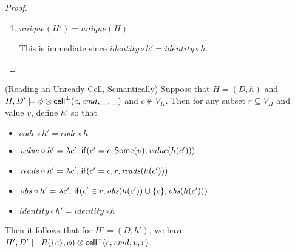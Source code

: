 \begin{proof}
\begin{enumerate}
\item $\mathit{unique}(H') = \mathit{unique}(H)$

This is immediate since $\mathit{identity} \circ h' = \mathit{identity} \circ h$.
\end{enumerate}
\end{proof}

\begin{lemma}{(Reading an Unready Cell, Semantically)}
Suppose that $H = (D,h)$ and $H, D' \models \phi \otimes
\mathsf{cell}^{\pm}({c}, {\mathit{cmd}}, {\_}, {\_})$ and $c \not\in V_H$. Then for any subset $r
\subseteq V_H$ and value $v$, define $h'$ so that
\begin{itemize}
\item $\mathit{code} \circ h' = \mathit{code} \circ h$ 
\item $\mathit{value} \circ h' = \lambda c'.\;\mathsf{if}({c' = c}, {\mathsf{Some}(v)}, {\mathit{value}(h(c'))})$ 
\item $\mathit{reads} \circ h' = \lambda c'.\;\mathsf{if}({c' = c}, {r}, {\mathit{reads}(h(c'))})$ 
\item $\mathit{obs} \circ h' = \lambda c'.\;\mathsf{if}({c' \in r}, {\mathit{obs}(h(c')) \cup \{{c}\}}, {\mathit{obs}(h(c'))})$ 
\item $\mathit{identity} \circ h' = \mathit{identity} \circ h$
\end{itemize}
Then it follows that for $H' = (D,h')$, we have $H', D' \models R(\{{c}\}, \phi) \otimes \mathsf{cell}^{+}({c}, {\mathit{cmd}}, {v}, {r})$.
\end{lemma}

